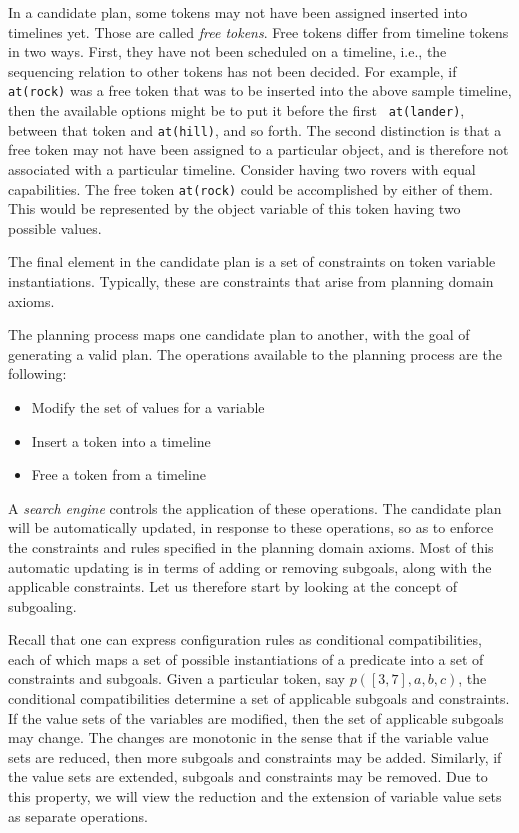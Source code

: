 In a candidate plan, some tokens may not have been assigned inserted
into timelines yet.  Those are called {\em free tokens}.  Free tokens
differ from timeline tokens in two ways.  First, they have not been
scheduled on a timeline, i.e., the sequencing relation to other tokens
has not been decided.  For example, if {\tt at(rock)} was a free token
that was to be inserted into the above sample timeline, then the
available options might be to put it before the first {\tt
at(lander)}, between that token and {\tt at(hill)}, and so forth.  The
second distinction is that a free token may not have been assigned to
a particular object, and is therefore not associated with a particular
timeline.  Consider having two rovers with equal capabilities.  The
free token {\tt at(rock)} could be accomplished by either of them. 
This would be represented by the object variable of this token having
two possible values.

The final element in the candidate plan is a set of constraints on
token variable instantiations.  Typically, these are constraints that
arise from planning domain axioms.

The planning process maps one candidate plan to another, with the goal
of generating a valid plan.  The operations available to the planning 
process  are the following:
  \begin{itemize}
  \item Modify the set of values for a variable
  \item Insert a token into a timeline
  \item Free a token from a timeline
  \end{itemize}
  A {\em search engine} controls the application of these operations.
The candidate plan will be automatically updated, in response to these
operations, so as to enforce the constraints and rules specified in
the planning domain axioms.  Most of this automatic updating is in
terms of adding or removing subgoals, along with the applicable
constraints.  Let us therefore start by looking at the concept of
subgoaling.

Recall that one can express configuration rules as conditional
compatibilities, each of which maps a set of possible instantiations
of a predicate into a set of constraints and subgoals.  Given a
particular token, say $p([3,7],{a,b,c})$, the conditional
compatibilities determine a set of applicable subgoals and
constraints.  If the value sets of the variables are modified, then
the set of applicable subgoals may change.  The changes are monotonic
in the sense that if the variable value sets are reduced, then more
subgoals and constraints may be added.  Similarly, if the value sets
are extended, subgoals and constraints may be removed.  Due to this
property, we will view the reduction and the extension of variable
value sets as separate operations.

